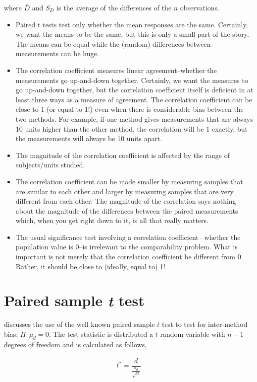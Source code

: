 \documentclass[12pt, a4paper]{report}
\theoremstyle{plain}
\theoremstyle{definition}
\theoremstyle{remark}
\begin{document}
	where $\bar{D}$ and $S_{D}$ is the average of the differences of
	the $n$ observations.
	\newpage
	\begin{itemize}
		\item Paired t tests test only whether the mean responses are the same. Certainly, we want the means to be the same, but this is only a small part of the story. The means can be equal while the (random) differences between measurements can be huge.
		\item The correlation coefficient measures linear agreement--whether the measurements go up-and-down together. Certainly, we want the measures to go up-and-down together, but the correlation coefficient itself is deficient in at least three ways as a measure of agreement.
		The correlation coefficient can be close to 1 (or equal to 1!) even when there is considerable bias between the two methods. For example, if one method gives measurements that are always 10 units higher than the other method, the correlation will be 1 exactly, but the measurements will always be 10 units apart.
		\item The magnitude of the correlation coefficient is affected by the range of subjects/units studied. 
		\item The correlation coefficient can be made smaller by measuring samples that are similar to each other and larger by measuring samples that are very different from each other. The magnitude of the correlation says nothing about the magnitude of the differences between the paired measurements which, when you get right down to it, is all that really matters.
		\item The usual significance test involving a correlation coefficient-- whether the population value is 0--is irrelevant to the comparability problem. What is important is not merely that the correlation coefficient be different from 0. Rather, it should be close to (ideally, equal to) 1!
	\end{itemize}
			\section{Paired sample \emph{t} test}
		
		\citet{Bartko} discusses the use of the well known paired sample
		$t$ test to test for inter-method bias; $H: \mu_{d}=0$. The test
		statistic is distributed a $t$ random variable with $n-1$ degrees
		of freedom and is calculated as follows,
		
		\begin{equation}
		t^{*} = \frac{\bar{d}}{ \frac{s_{d}}{\sqrt{n}}}
		\end{equation}
		
\end{document}
